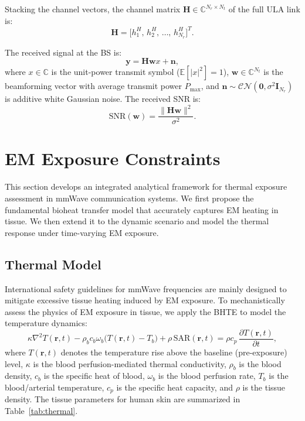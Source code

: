 \documentclass[journal]{IEEEtran}
\begin{document}
Stacking the channel vectors, the channel matrix $\mathbf{H} \in \mathbb{C}^{N_r \times N_t}$ of the full ULA link is:
\begin{equation}
    \mathbf{H} = \bigl[h_1^H,\, h_2^H,\, \ldots,\, h_{N_r}^H\bigr]^T.
    \label{eq:H}
\end{equation}

The received signal at the BS is:
\begin{equation}
    \mathbf{y} = \mathbf{H}\mathbf{w}x + \mathbf{n},
    \label{eq:rx}
\end{equation}
where $x \in \mathbb{C}$ is the unit-power transmit symbol ($\mathbb{E}[|x|^2] = 1$), $\mathbf{w} \in \mathbb{C}^{N_t}$ is the beamforming vector with average transmit power $P_{\max}$, and $\mathbf{n} \sim \mathcal{CN}(\mathbf{0}, \sigma^2\mathbf{I}_{N_r})$ is additive white Gaussian noise. The received SNR is:
\begin{equation}
    \mathrm{SNR}(\mathbf{w}) = \frac{\|\mathbf{H}\mathbf{w}\|^2}{\sigma^2}.
\end{equation}


\section{EM Exposure Constraints}
\label{sec:thermal}

This section develops an integrated analytical framework for thermal exposure assessment in mmWave communication systems. We first propose the fundamental bioheat transfer model that accurately captures EM heating in tissue. We then extend it to the dynamic scenario and model the thermal response under time-varying EM exposure.

\subsection{Thermal Model}

International safety guidelines for mmWave frequencies are mainly designed to mitigate excessive tissue heating induced by EM exposure. To mechanistically assess the physics of EM exposure in tissue, we apply the BHTE to model the temperature dynamics:
\begin{equation}
    \kappa\nabla^2 T(\mathbf{r}, t)
    - \rho_b c_b \omega_b\bigl(T(\mathbf{r}, t) - T_b\bigr)
    + \rho\,\mathrm{SAR}(\mathbf{r}, t)
    = \rho c_p\,\frac{\partial T(\mathbf{r}, t)}{\partial t},
    \label{eq:bhte}
\end{equation}
where $T(\mathbf{r}, t)$ denotes the temperature rise above the baseline (pre-exposure) level, $\kappa$ is the blood perfusion-mediated thermal conductivity, $\rho_b$ is the blood density, $c_b$ is the specific heat of blood, $\omega_b$ is the blood perfusion rate, $T_b$ is the blood/arterial temperature, $c_p$ is the specific heat capacity, and $\rho$ is the tissue density. The tissue parameters for human skin are summarized in Table~\ref{tab:thermal}.
\end{document}
